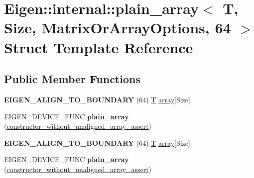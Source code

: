 \hypertarget{struct_eigen_1_1internal_1_1plain__array_3_01_t_00_01_size_00_01_matrix_or_array_options_00_0164_01_4}{}\section{Eigen\+:\+:internal\+:\+:plain\+\_\+array$<$ T, Size, Matrix\+Or\+Array\+Options, 64 $>$ Struct Template Reference}
\label{struct_eigen_1_1internal_1_1plain__array_3_01_t_00_01_size_00_01_matrix_or_array_options_00_0164_01_4}
\subsection*{Public Member Functions}
\begin{DoxyCompactItemize}
\item 
\mbox{\label{struct_eigen_1_1internal_1_1plain__array_3_01_t_00_01_size_00_01_matrix_or_array_options_00_0164_01_4_a1b0b69403eed325c842313e7455ee6f1}} 
{\bfseries E\+I\+G\+E\+N\+\_\+\+A\+L\+I\+G\+N\+\_\+\+T\+O\+\_\+\+B\+O\+U\+N\+D\+A\+RY} (64) \hyperlink{group___sparse_core___module}{T} \hyperlink{class_eigen_1_1array}{array}\mbox{[}Size\mbox{]}
\item 
\mbox{\label{struct_eigen_1_1internal_1_1plain__array_3_01_t_00_01_size_00_01_matrix_or_array_options_00_0164_01_4_ac4ddae4456c81464d78b8df4852b485e}} 
E\+I\+G\+E\+N\+\_\+\+D\+E\+V\+I\+C\+E\+\_\+\+F\+U\+NC {\bfseries plain\+\_\+array} (\hyperlink{struct_eigen_1_1internal_1_1constructor__without__unaligned__array__assert}{constructor\+\_\+without\+\_\+unaligned\+\_\+array\+\_\+assert})
\item 
\mbox{\label{struct_eigen_1_1internal_1_1plain__array_3_01_t_00_01_size_00_01_matrix_or_array_options_00_0164_01_4_a1b0b69403eed325c842313e7455ee6f1}} 
{\bfseries E\+I\+G\+E\+N\+\_\+\+A\+L\+I\+G\+N\+\_\+\+T\+O\+\_\+\+B\+O\+U\+N\+D\+A\+RY} (64) \hyperlink{group___sparse_core___module}{T} \hyperlink{class_eigen_1_1array}{array}\mbox{[}Size\mbox{]}
\item 
\mbox{\label{struct_eigen_1_1internal_1_1plain__array_3_01_t_00_01_size_00_01_matrix_or_array_options_00_0164_01_4_ac4ddae4456c81464d78b8df4852b485e}} 
E\+I\+G\+E\+N\+\_\+\+D\+E\+V\+I\+C\+E\+\_\+\+F\+U\+NC {\bfseries plain\+\_\+array} (\hyperlink{struct_eigen_1_1internal_1_1constructor__without__unaligned__array__assert}{constructor\+\_\+without\+\_\+unaligned\+\_\+array\+\_\+assert})
\end{DoxyCompactItemize}



